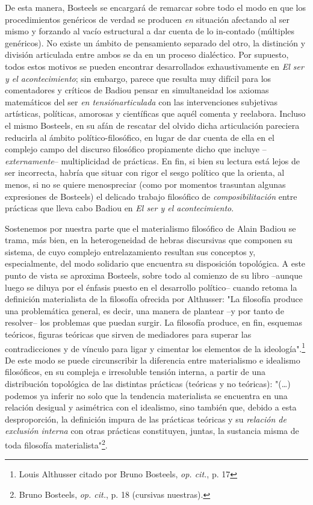 \documentclass{book}
\begin{document}
De esta manera, Bosteels se encargará de remarcar sobre todo el modo en
que los procedimientos genéricos de verdad se producen \emph{en}
situación afectando al ser mismo y forzando al vacío estructural a dar
cuenta de lo in-contado (múltiples genéricos). No existe un ámbito de
pensamiento separado del otro, la distinción y división articulada entre
ambos se da en un proceso dialéctico. Por supuesto, todos estos motivos
se pueden encontrar desarrollados exhaustivamente en \emph{El ser y el
acontecimiento}; sin embargo, parece que resulta muy difícil para los
comentadores y críticos de Badiou pensar en simultaneidad los axiomas
matemáticos del ser \emph{en tensiónarticulada} con las intervenciones
subjetivas artísticas, políticas, amorosas y científicas que aquél
comenta y reelabora. Incluso el mismo Bosteels, en su afán de rescatar
del olvido dicha articulación pareciera reducirla al ámbito
político-filosófico, en lugar de dar cuenta de ella en el complejo campo
del discurso filosófico propiamente dicho que incluye
--\emph{externamente}-- multiplicidad de prácticas. En fin, si bien su
lectura está lejos de ser incorrecta, habría que situar con rigor el
sesgo político que la orienta, al menos, si no se quiere menospreciar
(como por momentos trasuntan algunas expresiones de Bosteels) el
delicado trabajo filosófico de \emph{composibilitación} entre prácticas
que lleva cabo Badiou en \emph{El ser y el acontecimiento}.

Sostenemos por nuestra parte que el materialismo filosófico de Alain
Badiou se trama, más bien, en la heterogeneidad de hebras discursivas
que componen su sistema, de cuyo complejo entrelazamiento resultan sus
conceptos y, especialmente, del modo solidario que encuentra su
disposición topológica. A este punto de vista se aproxima Bosteels,
sobre todo al comienzo de su libro --aunque luego se diluya por el
énfasis puesto en el desarrollo político-- cuando retoma la definición
materialista de la filosofía ofrecida por Althusser: "La filosofía
produce una problemática general, es decir, una manera de plantear --y
por tanto de resolver-- los problemas que puedan surgir. La filosofía
produce, en fin, esquemas teóricos, figuras teóricas que sirven de
mediadores para superar las contradicciones y de vínculo para ligar y
cimentar los elementos de la ideología".\footnote{Louis Althusser citado
  por Bruno Bosteels, \emph{op. cit.}, p. 17} De este modo se puede
circunscribir la diferencia entre materialismo e idealismo filosóficos,
en su compleja e irresoluble tensión interna, a partir de una
distribución topológica de las distintas prácticas (teóricas y no
teóricas): "(\dots) podemos ya inferir no solo que la tendencia
materialista se encuentra en una relación desigual y asimétrica con el
idealismo, sino también que, debido a esta desproporción, la definición
impura de las prácticas teóricas y su \emph{relación de exclusión
interna} con otras prácticas constituyen, juntas, la sustancia misma de
toda filosofía materialista"\footnote{Bruno Bosteels, \emph{op. cit.},
  p. 18 (cursivas nuestras).}.
\end{document}
